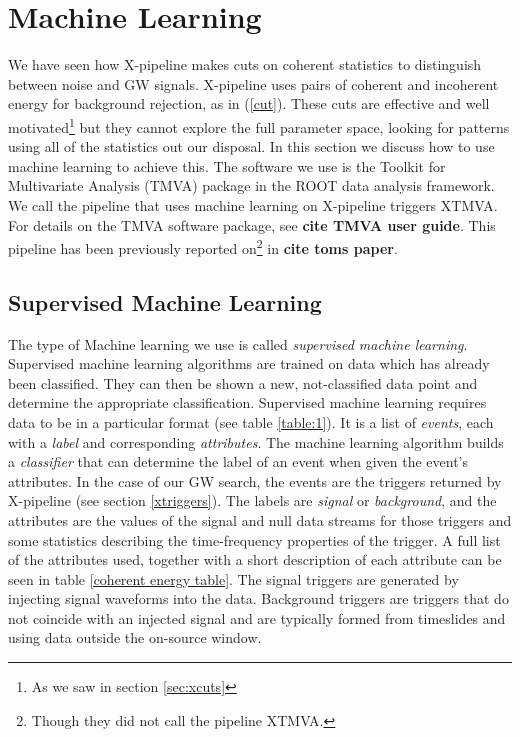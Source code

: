 \documentclass[11pt]{cuthesis}
\newcommand{\xp}{X-pipeline }
\begin{document}
\section{Machine Learning} \label{sec:ML}
We have seen how \xp makes cuts on coherent statistics to distinguish between noise and GW signals. \xp uses pairs of coherent and incoherent energy for background rejection, as in (\ref{cut}). These cuts are effective and well motivated\footnote{As we saw in section \ref{sec:xcuts}} but they cannot explore the full parameter space, looking for patterns using all of the statistics out our disposal. In this section we discuss how to use machine learning to achieve this. The software we use is the Toolkit for Multivariate Analysis (TMVA) package in the ROOT data analysis framework. We call the pipeline that uses machine learning on \xp triggers XTMVA. For details on the TMVA software package, see \textbf{cite TMVA user guide}. This pipeline has been previously reported on\footnote{Though they did not call the pipeline XTMVA.} in \textbf{cite toms paper}.

\subsection{Supervised Machine Learning}
The type of Machine learning we use is called \textit{supervised machine learning}. Supervised machine learning algorithms are trained on data which has already been classified. They can then be shown a new, not-classified data point and determine the appropriate classification. Supervised machine learning requires data to be in a particular format (see table \ref{table:1}). It is a list of \emph{events}, each with a \emph{label} and corresponding \emph{attributes}. The machine learning algorithm builds a \textit{classifier} that can determine the label of an event when given the event's attributes. In the case of our GW search, the events are the triggers returned by \xp (see section \ref{xtriggers}). The labels are \textit{signal} or \textit{background}, and the attributes are the values of the signal and null data streams for those triggers and some statistics describing the time-frequency properties of the trigger. A full list of the attributes used, together with a short description of each attribute can be seen in table \ref{coherent energy table}. The signal triggers are generated by injecting signal waveforms into the data. Background triggers are triggers that do not coincide with an injected signal and are typically formed from timeslides and using data outside the on-source window.
\end{document}

